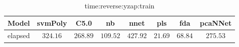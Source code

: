 \begin{table}[!ht]
	\centering
	\begin{tabular}{|c|c|c|c|c|c|c|c|}
		\hline
		Model & svmPoly & C5.0 & nb & nnet & pls & fda & pcaNNet \\ \hline
		elapsed & $324.16$ & $268.89$ & $109.52$ & $427.92$ & $21.69$ & $68.84$ & $275.53$ \\ \hline
	\end{tabular}
	\caption{time:reverse:yzap:train}
	\label{tab:time:reverse:yzap:train}
\end{table}
